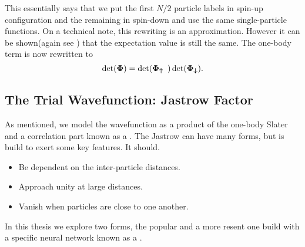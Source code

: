         This essentially says that we put the first $N/2$ particle labels in
        spin-up configuration and the remaining in spin-down and use the same
        single-particle functions.  On a technical note, this rewriting is an
        approximation. However it can be shown(again see \cite{splitDet}) that
        the expectation value is still the same. The one-body term is now
        rewritten to
            \begin{equation}
                \det(\boldsymbol{{\Phi}}) = \det(\boldsymbol{{\Phi_{\uparrow}}})
                \det(\boldsymbol{{\Phi_{\downarrow}}}).
                \label{eq:slatersplitdef}
            \end{equation}

    \subsection{The Trial Wavefunction: Jastrow Factor\label{susec:TWFJastrow}}
        As mentioned, we model the wavefunction as a product of the one-body
        Slater and a correlation part known as a . The
        Jastrow can have many forms, but is build to exert some key features.
        It should\cite{jastrow}. 
        \begin{itemize}
            \item Be dependent on the inter-particle distances.
            \item Approach unity at large distances.
            \item Vanish when particles are close to one another.
        \end{itemize}
        In this thesis we explore two forms, the popular
         and a more resent one build with a specific
        neural network known as a .

